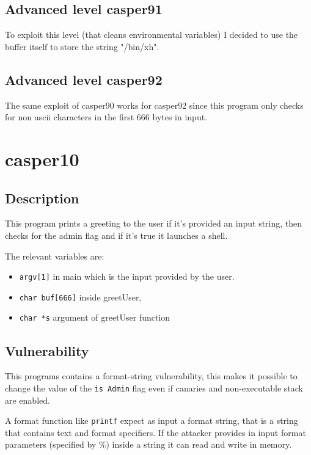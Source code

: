 \documentclass[a4paper,12pt]{article}
\begin{document}
\subsection{Advanced level casper91}

To exploit this level (that cleans environmental variables) I decided to use the buffer itself to store the string "/bin/xh".

\subsection{Advanced level casper92}
The same exploit of casper90 works for casper92 since this program only checks for non ascii characters in the first 666 bytes in input.





\section{casper10}

\subsection{Description}
This program prints a greeting to the user if it's provided an input string, then checks for the admin flag and if it's true it launches a shell. 

The relevant variables are:
\begin{itemize}

\item \texttt{argv[1]} in main which is the input provided by the user.
\item \texttt{char buf[666]} inside greetUser,
\item \texttt{char *s} argument of greetUser function

\end{itemize}


\subsection{Vulnerability}

This programs contains a format-string vulnerability, this makes it possible to change the value of the \texttt{is Admin} flag even if canaries and non-executable stack are enabled.

A format function like \texttt{printf} expect as input a format string, that is a string that contains text and format specifiers. If the attacker provides in input format parameters (specified by \%) inside a string it can read and write in memory. 
\end{document}

